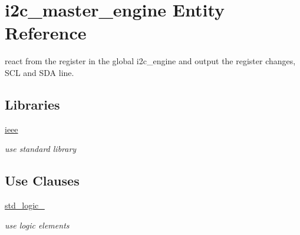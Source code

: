 \hypertarget{classi2c__master__engine}{}\section{i2c\+\_\+master\+\_\+engine Entity Reference}
\label{classi2c__master__engine}


react from the register in the global i2c\+\_\+engine and output the register changes, S\+CL and S\+DA line.  


\subsection*{Libraries}
 \begin{DoxyCompactItemize}
\item 
\hyperlink{classi2c__master__engine_a0a6af6eef40212dbaf130d57ce711256}{ieee} 
\begin{DoxyCompactList}\small\item\em use standard library \end{DoxyCompactList}\end{DoxyCompactItemize}
\subsection*{Use Clauses}
 \begin{DoxyCompactItemize}
\item 
\hyperlink{classi2c__master__engine_acd03516902501cd1c7296a98e22c6fcb}{std\+\_\+logic\+\_}   
\begin{DoxyCompactList}\small\item\em use logic elements \end{DoxyCompactList}\end{DoxyCompactItemize}
